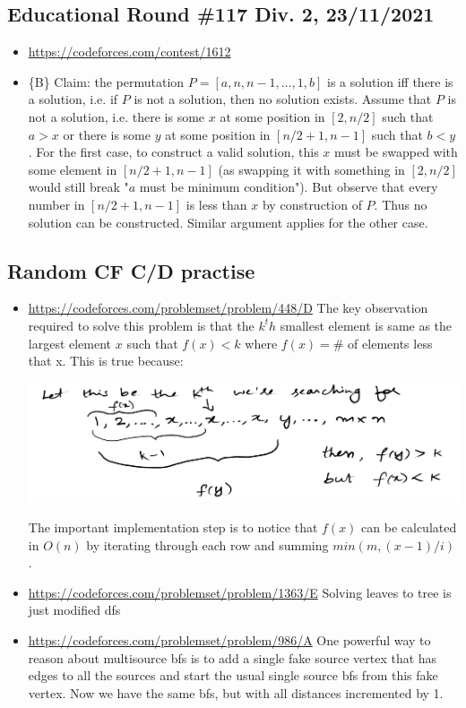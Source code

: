 \documentclass[titlepage, 12pt]{book}
\begin{document}
\subsection{Educational Round \#117 Div. 2, 23/11/2021}
\begin{itemize}
  \item\url{https://codeforces.com/contest/1612}
  \item \{B\} Claim: the permutation $P = [a, n, n - 1, \dots, 1, b]$ is a
    solution iff there is a solution, i.e. if $P$ is not a solution, then no
    solution exists. Assume that $P$ is not a solution, i.e. there is some $x$
    at some position in $[2, n / 2]$ such that $a > x$ or there is some $y$ at some
    position in $[n / 2 + 1, n - 1]$ such that $b < y$. For the first case, to
    construct a valid solution, this $x$ must be swapped with some element in
    $[n / 2 + 1, n - 1]$ (as swapping it with something in $[2, n / 2]$ would
    still break "$a$ must be minimum condition"). But observe that every number
    in $[n / 2 + 1, n - 1]$ is less than $x$ by construction of $P$. Thus no
    solution can be constructed. Similar argument applies for the other case.
\end{itemize}

\subsection{Random CF C/D practise}
\begin{itemize}
  \item\url{https://codeforces.com/problemset/problem/448/D}
    The key observation required to solve this problem is that the $k^th$
    smallest element is same as the largest element $x$ such that $f(x) < k$
    where $f(x) = \#$ of elements less that x. This is true because:

    \includegraphics[scale=0.25]{cf448d}

    The important implementation step is to notice that $f(x)$ can be calculated
    in $O(n)$ by iterating through each row and summing $min(m, (x - 1) / i)$.
    
  \item\url{https://codeforces.com/problemset/problem/1363/E}
    Solving leaves to tree is just modified dfs

  \item\url{https://codeforces.com/problemset/problem/986/A}
    One powerful way to reason about multisource bfs is to add a single fake
    source vertex that has edges to all the sources and start the usual single
    source bfs from this fake vertex. Now we have the same bfs, but with all
    distances incremented by 1.
    
\end{itemize}
\end{document}
